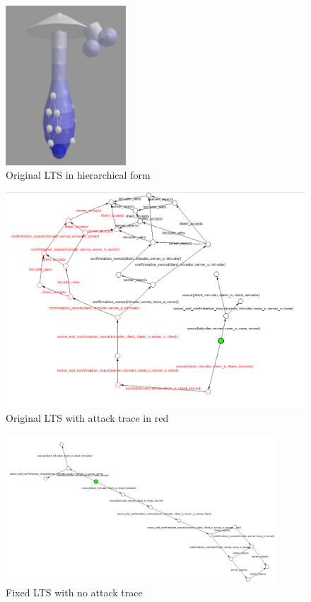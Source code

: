\documentclass[11pt]{article}
\theoremstyle{definition}
\theoremstyle{plain}
\begin{document}
\begin{appendices}
\begin{figure}
\centering
\includegraphics[width=0.4\textwidth, keepaspectratio]{img/Needham-Schroeder/state-LTSview.png}
\caption{Original LTS in hierarchical form}\label{ltsNSView}
\end{figure}
\begin{figure}
\includegraphics[width=\textwidth,keepaspectratio]{img/Needham-Schroeder/state-LTSgraph.png}
\caption{Original LTS with attack trace in red}\label{ltsNSGraph}
\end{figure}

\begin{figure}
\centering
\includegraphics[width=0.9\textwidth, keepaspectratio]{img/Needham-Schroeder/fixed-state-LTSgraph.png}
\caption{Fixed LTS with no attack trace}\label{ltsNSFixedGraph}
\end{figure}


\end{appendices}
\end{document}
